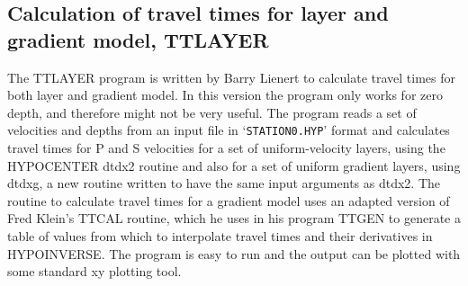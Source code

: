 
\subsection{Calculation of travel times for layer and gradient model, TTLAYER}

The TTLAYER program is written by Barry Lienert to calculate travel times for both layer and gradient model. In this version the program only works for zero depth, and therefore might not be very useful. The program reads a set of velocities and depths from an input file in `\texttt{STATION0.HYP}' format and calculates travel times for P and S velocities for a set of uniform-velocity layers, using the HYPOCENTER dtdx2 routine and also for a set of uniform gradient layers, using dtdxg, a new routine written to have the same input arguments as dtdx2. \newline
The routine to calculate travel times for a gradient model uses an adapted version of Fred Klein's TTCAL routine, which he uses in his program TTGEN to generate a table of values from which to interpolate travel times and their derivatives in HYPOINVERSE.  \newline
The program is easy to run and the output can be plotted with some standard xy plotting tool. 

